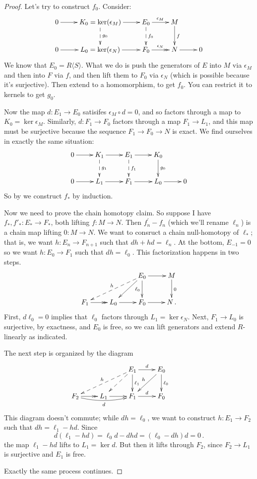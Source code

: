\begin{proof} Let's try to construct $f_0$. Consider:
\begin{equation*}
\xymatrix{0\ar[r] & K_0=\ker(\epsilon_M)\ar[r]\ar@{-->}[d]^{g_0} & E_0\ar[r]^{\epsilon_M}\ar@{-->}[d]^{f_0} & M\ar[d]^f &\\
0\ar[r] & L_0=\ker(\epsilon_N)\ar[r] & F_0\ar@{->>}[r]^{\epsilon_N} & N\ar[r] & 0}
\end{equation*}
We know that $E_0=R\langle S\rangle$. What we do is push the generators of $E$ into $M$ via $\epsilon_M$ and then into $F$ via $f$, and then lift them to $F_0$ via  $\epsilon_N$ (which is possible because it's surjective). Then extend to
a homomorphism, to get $f_0$. You can restrict it to kernels to get $g_0$. 

Now the map $d:E_1\to E_0$ satisifes $\epsilon_M\circ d=0$, and so factors through a map to $K_0=\ker\epsilon_M$. Similarly, $d:F_1\to F_0$ factors through 
a map $F_1\to L_1$, and this map must be surjective because the sequence
$F_1\to F_0\to N$ is exact. We find ourselves in exactly the same situation:
\begin{equation*}
\xymatrix{0\ar[r] & K_1\ar[r]\ar@{-->}[d]^{g_1} & E_1\ar[r]\ar@{-->}[d]^{f_1} & K_0\ar[d]^{g_0} &\\
0\ar[r] & L_1\ar[r] & F_1\ar[r] & L_0\ar[r] & 0}
\end{equation*}
So by we construct $f_*$ by induction.

Now we need to prove the chain homotopy claim. So suppose I have $f_\ast,f'_\ast:E_\ast\to F_\ast$, both lifting $f:M\to N$. Then $f^\prime_n-f_n$ (which we'll rename $\ell_n$) is a chain map lifting $0:M\to N$. 
We want to consruct a chain null-homotopy of $\ell_\ast$; that is, we want $h:E_n\to F_{n+1}$ such that $dh+hd=\ell_n$. At the bottom, $E_{-1}=0$ so we want
$h:E_0\to F_1$ such that $dh=\ell_0$. This factorization happens in two steps. 
\begin{equation*}
\xymatrix{ & & E_0\ar[d]_{\ell_0}\ar[dl]\ar@{-->}[dll]_h \ar[r] & M\ar[d]^0 \\
F_1\ar@{->>}[r] & L_0\ar[r] & F_0 \ar[r] & N \,.
}\end{equation*}
First, $d\ell_0=0$ implies that $\ell_0$ factors through $L_1=\ker\epsilon_N$.
Next, $F_1\to L_0$ is surjective, by exactness, and $E_0$ is free, so we can lift generators and extend $R$-linearly as indicated. 

The next step is organized by the diagram
\begin{equation*}
\xymatrix{ & & E_1\ar[r]^d\ar[d]^{\ell_1}\ar@{-->}[dl]\ar@{-->}[dll]_h & 
E_0\ar[d]^{\ell_0}\ar[dl]_h & \\
F_2\ar@{->>}[r]\ar@/_/[rr]_d & L_1\ar[r] & F_1\ar[r]^d & F_0}
\end{equation*}
This diagram doesn't commute; while $dh=\ell_0$, we want to construct 
$h:E_1\to F_2$ such that $dh=\ell_1-hd$. Since 
\[
d(\ell_1-hd)=\ell_0d-dhd=(\ell_0-dh)d=0\,.
\]
the map $\ell_1-hd$ lifts to $L_1=\ker d$. But then it lifts through $F_2$, 
since $F_2\to L_1$ is surjective and $E_1$ is free. 

Exactly the same process continues.
\end{proof}

